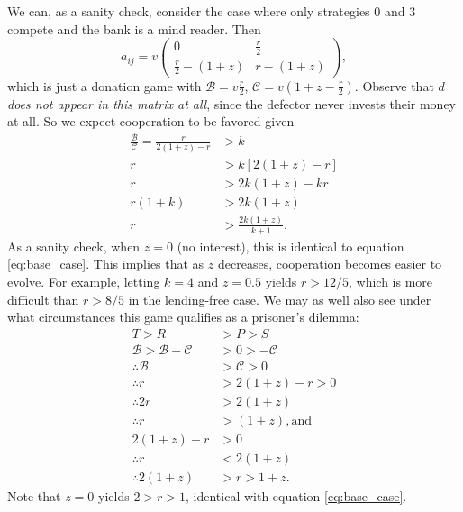 \documentclass[13pt]{amsart}
\newcommand{\B}{\mathcal{B}}
\newcommand{\C}{\mathcal{C}}
\begin{document}
We can, as a sanity check, consider the case where only strategies $0$ and $3$ compete and the bank is a mind reader.
Then
\begin{equation}
    a_{ij} = v
    \begin{pmatrix}
        0 & \frac{r}{2} \\
        \frac{r}{2} - (1+z) & r - (1+z)
    \end{pmatrix},
\end{equation}
which is just a donation game with $\B = v\frac{r}{2}$, $\C = v(1 + z - \frac{r}{2})$.
Observe that $d$ \emph{does not appear in this matrix at all}, since the defector never invests their money at all.
So we expect cooperation to be favored given
\begin{equation}
	\begin{split}
        \frac{\B}{\C} = \frac{r}{2(1+z) - r} & > k
        \\
        r & > k[2(1+z)-r]
        \\
        r & > 2k(1+z) - kr
        \\
        r(1+k) & > 2k(1+z)
        \\
        r & > \frac{2k(1+z)}{k+1}.
    \end{split}
\end{equation}
As a sanity check, when $z = 0$ (no interest), this is identical to equation \ref{eq:base_case}.
This implies that as $z$ decreases, cooperation becomes easier to evolve.
For example, letting $k = 4$ and $z = 0.5$ yields $r > 12/5$, which is more difficult than $r > 8/5$ in the lending-free case.
We may as well also see under what circumstances this game qualifies as a prisoner's dilemma:
\begin{equation}
    \begin{split}
        T > R & > P > S \\
        \mathcal{B} > \mathcal{B} - \mathcal{C} & > 0 > -\mathcal{C} \\
        \therefore \mathcal{B} & > \mathcal{C} > 0 \\
        \therefore r & > 2(1 + z) - r > 0 \\
        \therefore 2r & > 2(1+z)\\
        \therefore r & > (1+z), \text{and}
        \\
        2(1+z) - r & > 0 \\
        \therefore r & < 2(1+z) \\
        \therefore 2(1+z) & > r > 1+z.
    \end{split}
\end{equation}
Note that $z = 0$ yields $2 > r > 1$, identical with equation \ref{eq:base_case}.
\end{document}
